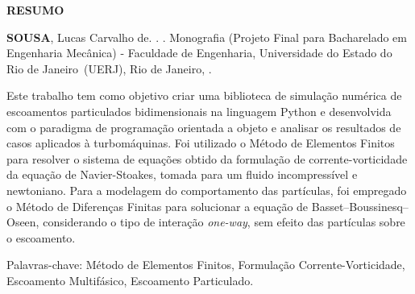\begin{center}
\textbf{RESUMO}
\end{center}

%
%

$\!$\\

\hspace{-1.3cm}\textbf{SOUSA}, Lucas Carvalho de. \textit{\mainTitle}. \numPages. Monografia (Projeto Final para Bacharelado em Engenharia Mecânica) - Faculdade de Engenharia, Universidade do Estado do Rio de Janeiro~(UERJ), Rio de Janeiro, \curYear.

\vspace{.2cm}

Este trabalho tem como objetivo criar uma biblioteca de simulação numérica de escoamentos particulados bidimensionais na linguagem Python e desenvolvida com o paradigma de programação orientada a objeto e analisar os resultados de casos aplicados à turbomáquinas.
Foi utilizado o Método de Elementos Finitos para resolver o sistema de equações obtido da formulação de corrente-vorticidade da equação de Navier-Stoakes, tomada para um fluido incompressível e newtoniano.
Para a modelagem do comportamento das partículas, foi empregado o Método de Diferenças Finitas para solucionar a equação de Basset–Boussinesq–Oseen, considerando o tipo de interação \textit{one-way}, sem efeito das partículas sobre o escoamento.

\vspace{1cm}

\hspace{-1.3cm}Palavras-chave: Método de Elementos Finitos, Formulação Corrente-Vorticidade, Escoamento Multifásico, Escoamento Particulado.
